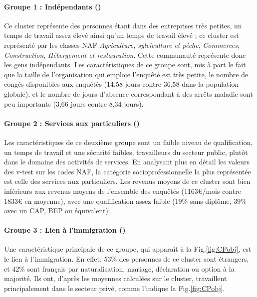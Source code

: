 \documentclass[11pt,fleqn,a4paper,openany,frenchb]{book} %
\begin{document}
\paragraph{Groupe 1 : Indépendants (\INDEP)\\}
Ce cluster représente des personnes étant dans des entreprises très petites, un temps de travail assez élevé ainsi qu'un temps de travail élevé ; ce cluster est représenté par les classes NAF \textit{Agriculture, sylviculture et pêche}, \textit{Commerces}, \textit{Construction}, \textit{Hébergement et restauration}. Cette communauté représente donc les gens indépendants. Les caractéristiques de ce groupe sont, mis à part le fait que la taille de l'organisation qui emploie l'enquêté est très petite, le nombre de congés disponibles aux enquêtés (14,58 jours contre 36,58 dans la population globale), et le nombre de jours d'absence correspondant à des arrêts maladie sont peu importants (3,66 jours contre 8,34 jours).

\paragraph{Groupe 2 : Services aux particuliers (\SERV)\\}
Les caractéristiques de ce deuxième groupe sont un faible niveau de qualification, un temps de travail et une sécurité faibles, travailleurs du secteur public, plutôt dans le domaine des activités de services. En analysant plus en détail les valeurs des v-test sur les codes NAF, la catégorie socioprofessionnelle la plus représentée est celle des services aux particuliers. Les revenus moyens de ce cluster sont bien inférieurs aux revenus moyens de l'ensemble des enquêtés (1163\euro{}/mois contre 1833\euro{} en moyenne), avec une qualification assez faible (19\% sans diplôme, 39\% avec un CAP, BEP ou équivalent).

\paragraph{Groupe 3 : Lien à l'immigration (\IMM)\\}
Une caractéristique principale de ce groupe, qui apparaît à la Fig.\ref{fig:CPobj}, est le lien à l'immigration. En effet, 53\% des personnes de ce cluster sont étrangers, et 42\% sont français par naturalisation, mariage, déclaration ou option à la majorité. Ils ont, d'après les moyennes calculées sur le cluster, travaillent principalement dans le secteur privé, comme l'indique la Fig.\ref{fig:CPobj}.
\end{document}
